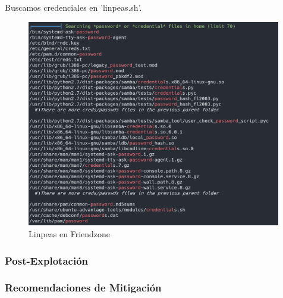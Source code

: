         \large{Buscamos credenciales en 'linpeas.sh'.}
        \par
        \begin{figure}[H]
            \centering
            \includegraphics[width=0.99\textwidth]{informe4/imagenes/friendzone/24_linpeas.png}
            \caption{Linpeas en Friendzone} 
        \end{figure}


    \subsubsection{Post-Explotación}

    \subsubsection{Recomendaciones de Mitigación}
